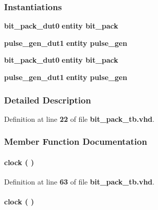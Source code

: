 \subsubsection*{Instantiations}
 \begin{DoxyCompactItemize}
\item 
{\bf bit\+\_\+pack\+\_\+dut0}  {\bfseries entity bit\+\_\+pack}   
\item 
{\bf pulse\+\_\+gen\+\_\+dut1}  {\bfseries entity pulse\+\_\+gen}   
\item 
{\bf bit\+\_\+pack\+\_\+dut0}  {\bfseries entity bit\+\_\+pack}   
\item 
{\bf pulse\+\_\+gen\+\_\+dut1}  {\bfseries entity pulse\+\_\+gen}   
\end{DoxyCompactItemize}


\subsubsection{Detailed Description}


Definition at line {\bf 22} of file {\bf bit\+\_\+pack\+\_\+tb.\+vhd}.



\subsubsection{Member Function Documentation}
\paragraph[{clock}]{\setlength{\rightskip}{0pt plus 5cm} {\bfseries \textcolor{vhdlchar}{ }} clock ( ) \hspace{0.3cm}{\ttfamily [Process]}}\label{classbit__pack__tb_1_1tb__behave_af761a67e9d7ce9e23381088b6f2ae893}


Definition at line {\bf 63} of file {\bf bit\+\_\+pack\+\_\+tb.\+vhd}.

\paragraph[{clock}]{\setlength{\rightskip}{0pt plus 5cm} {\bfseries \textcolor{vhdlchar}{ }} clock ( ) \hspace{0.3cm}{\ttfamily [Process]}}\label{classbit__pack__tb_1_1tb__behave_af761a67e9d7ce9e23381088b6f2ae893}


